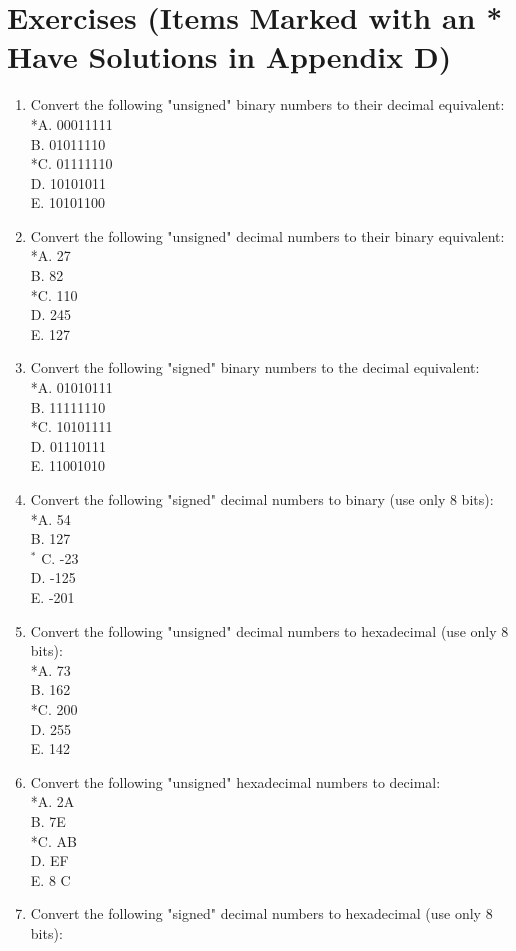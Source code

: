 \documentclass[10pt]{book}
\begin{document}
\section{Exercises (Items Marked with an * Have Solutions in Appendix D)}
\begin{enumerate}
  \item Convert the following "unsigned" binary numbers to their decimal equivalent:\\
*A. 00011111\\
B. 01011110\\
*C. 01111110\\
D. 10101011\\
E. 10101100
  \item Convert the following "unsigned" decimal numbers to their binary equivalent:\\
*A. 27\\
B. 82\\
*C. 110\\
D. 245\\
E. 127
  \item Convert the following "signed" binary numbers to the decimal equivalent:\\
*A. 01010111\\
B. 11111110\\
*C. 10101111\\
D. 01110111\\
E. 11001010
  \item Convert the following "signed" decimal numbers to binary (use only 8 bits):\\
*A. 54\\
B. 127\\
${ }^{*}$ C. -23\\
D. -125\\
E. -201
  \item Convert the following "unsigned" decimal numbers to hexadecimal (use only 8 bits):\\
*A. 73\\
B. 162\\
*C. 200\\
D. 255\\
E. 142
  \item Convert the following "unsigned" hexadecimal numbers to decimal:\\
*A. 2A\\
B. 7E\\
*C. AB\\
D. EF\\
E. 8 C
  \item Convert the following "signed" decimal numbers to hexadecimal (use only 8 bits):\\

\end{enumerate}
\end{document}
